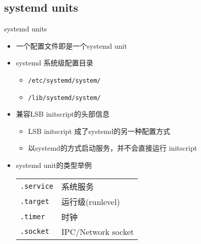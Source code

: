 \documentclass[CJK,xetex]{beamer}
\newcommand{\mydir}[1]{{\color{red} \texttt{#1}}}
\begin{document}
\subsection{systemd units}
\begin{frame}{systemd units}
  \begin{itemize}[<+->]
  \item 一个配置文件即是一个systemd unit
  \item systemd 系统级配置目录
    \begin{itemize}
    \item \mydir{/etc/systemd/system/}
    \item \mydir{/lib/systemd/system/}
    \end{itemize}
  \item 兼容LSB initscript的头部信息
    \begin{itemize}
    \item LSB initscript 成了systemd的另一种配置方式
    \item 以systemd的方式启动服务，并不会直接运行 initscript
    \end{itemize}
  \item systemd unit的类型举例\\
    \begin{tabular}[]{l|l}
      \hline
      \texttt{.service} & 系统服务\\
      \texttt{.target}  & 运行级(runlevel)\\
      \texttt{.timer}   & 时钟\\
      \texttt{.socket}  & IPC/Network socket\\ 
      \hline
    \end{tabular}
  \end{itemize}
\end{frame}
\end{document}

